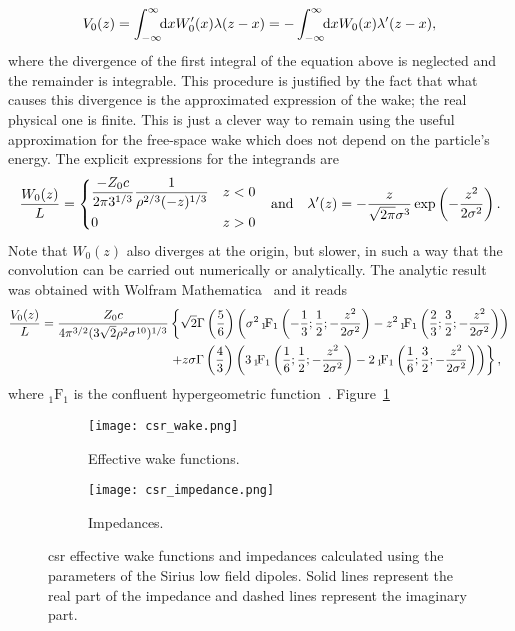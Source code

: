     \begin{align}\label{eq:csr_convolution}
        V_0(z) = \int_{-\infty}^{\infty}\!\!\text{d}x W'_0(x)\lambda(z-x) = -\int_{-\infty}^{\infty}\!\!\text{d}x W_0(x)\lambda'(z-x),
    \end{align}
    where the divergence of the first integral of the equation above is neglected and the remainder is integrable. This procedure is justified by the fact that what causes this divergence is the approximated expression of the wake; the real physical one is finite. This is just a clever way to remain using the useful approximation for the free-space wake which does not depend on the particle's energy. The explicit expressions for the integrands are
    \begin{align}
        \frac{W_0(z)}{L} =
        \begin{dcases}
            \frac{-Z_0 c}{2 \pi 3^{1/3}} \frac{1}{\rho^{2/3}(-z)^{1/3}} & z<0\\
            0 & z>0
        \end{dcases}& &\text{and} &&\lambda'(z) = -\frac{z}{\sqrt{2\pi}\sigma^3}\exp\left(-\frac{z^2}{2\sigma^2}\right).
    \end{align}
    Note that $W_0(z)$ also diverges at the origin, but slower, in such a way that the convolution can be carried out numerically or analytically. The analytic result was obtained with Wolfram Mathematica~\cite{WolframResearchInc.2016} and it reads
    \begin{align}\nonumber
        \frac{V_0(z)}{L} =
        \frac{Z_0 c}{4\pi^{3/2}(3\sqrt{2}\rho^2\sigma^{10})^{1/3}}
        &\left\{
            \sqrt{2}\Gamma\left(\frac56\right)
            \left(
                \sigma^2{\,}_{1}\!\text{F}_{1}\left(-\frac13;\frac12;-\frac{z^2}{2\sigma^2}\right) -
                      z^2{\,}_{1}\!\text{F}_{1}\left(\frac23;\frac32;-\frac{z^2}{2\sigma^2}\right)
                \right)\right. \\\nonumber
        &   \left.+ z\sigma\Gamma\left(\frac43\right)
            \left(
                 3{\,}_{1}\!\text{F}_{1}\left(\frac16;\frac12;-\frac{z^2}{2\sigma^2}\right) -
                 2{\,}_{1}\!\text{F}_{1}\left(\frac16;\frac32;-\frac{z^2}{2\sigma^2}\right)\right)\right\},
    \end{align}
    where ${}_1\!\text{F}_1$ is the confluent hypergeometric function~\cite{wiki2017b}.
    Figure~\ref{fig:csr_wake}
    \begin{figure}
        \centering
        \begin{subfigure}[c]{0.48\textwidth}
            \centering
            \texttt{[image: csr\_wake.png]}
            \caption{Effective wake functions.}
            \label{fig:csr_wake}
        \end{subfigure}\hfill
        \begin{subfigure}[c]{0.48\textwidth}
            \centering
            \texttt{[image: csr\_impedance.png]}
            \caption{Impedances.}
            \label{fig:csr_impedance}
        \end{subfigure}
        \caption{\gls{csr} effective wake functions and impedances calculated using the parameters of the Sirius low field dipoles. Solid lines represent the real part of the impedance and dashed lines represent the imaginary part.}
    \end{figure}
